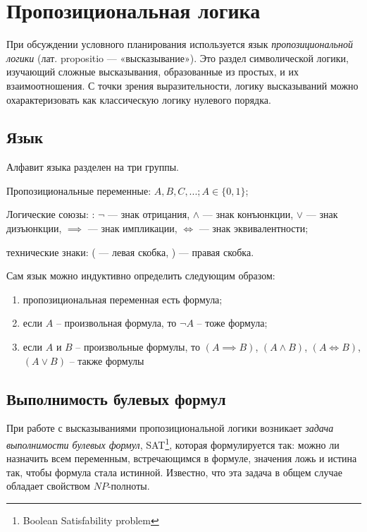 \section{Пропозициональная логика}

При обсуждении условного планирования используется язык \emph{пропозицио\-нальной логики} (лат. propositio --- «высказывание»). Это раздел символической логики,
изучающий сложные высказывания, образованные из простых, и их
взаимоотношения. С точки зрения выразительности, логику высказываний
можно охарактеризовать как классическую логику нулевого порядка.

\subsection{Язык}

Алфавит языка разделен на три группы.

\begin{itemize*}
\item
  Пропозициональные переменные: $A, B, C, ...; A \in \{0, 1\}$;
\item
  Логические союзы: : $\neg$ --- знак отрицания, $\land$ --- знак
  конъюнкции, $\lor$ --- знак дизъюнкции, $\implies$ --- знак
  импликации, $\iff$ --- знак эквивалентности;
\item
  технические знаки: ( --- левая скобка, ) --- правая скобка.
\end{itemize*}

Сам язык можно индуктивно определить следующим образом:
\begin{enumerate}
 \item пропозициональная переменная есть формула;
 \item если $A$ -- произвольная формула, то $\neg A$ -- тоже формула;
 \item если $A$ и $B$ -- произвольные формулы, то $(A \implies B)$, $(A \land B)$, $(A \iff B)$, $(A \lor B)$ -- также формулы
\end{enumerate}

\subsection{Выполнимость булевых формул}

При работе с высказываниями пропозициональной логики возникает
\emph{задача выполнимости булевых формул}, SAT\footnote{Boolean Satisfability problem}, которая формулируется так:
можно ли назначить всем переменным, встречающимся в формуле, значения
ложь и истина так, чтобы формула стала истинной. Известно, что эта
задача в общем случае обладает свойством $NP$-полноты.

